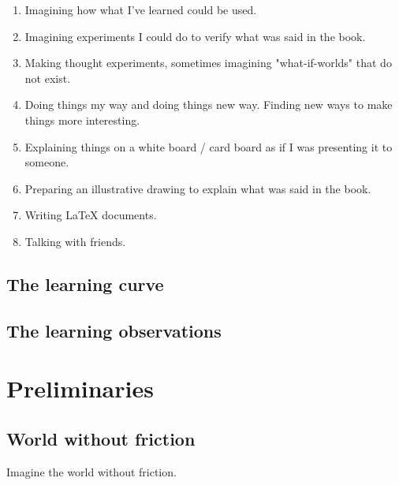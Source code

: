 \documentclass[12pt]{report}
\begin{document}
\begin{enumerate}

\item Imagining how what I've learned could be used.

\item Imagining experiments I could do to verify what was said in the book.

\item Making thought experiments, sometimes imagining "what-if-worlds" that do not exist.

\item Doing things my way and doing things new way. Finding new ways to make things more interesting.

\item Explaining things on a white board / card board as if I was presenting it to someone.

\item Preparing an illustrative drawing to explain what was said in the book.

\item Writing LaTeX documents.

\item Talking with friends.


\end{enumerate}



\section{The learning curve} \label{chap:learning_curve}




\section{The learning observations} \label{chap:learning_observations}



\chapter{Preliminaries}



\section{World without friction} \label{chap:without_friction}

Imagine the world without friction.
\end{document}
